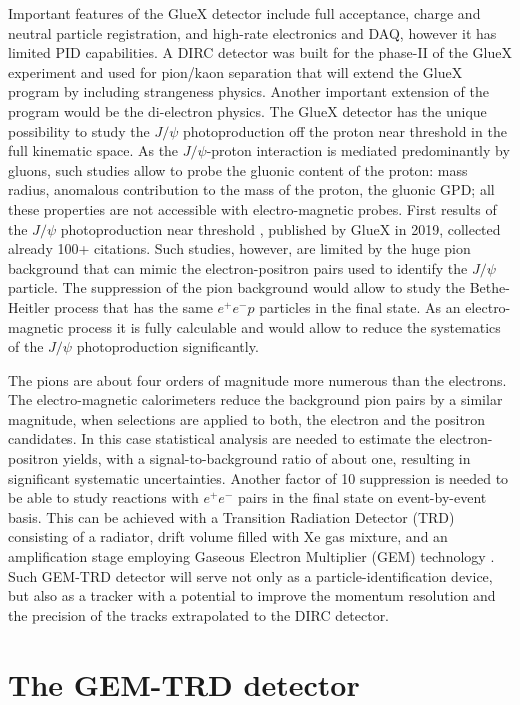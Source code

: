 \documentclass[%
preprint,
nofootinbib,
 amsmath,amssymb,
 aps,
floatfix,
]{revtex4-1}
\begin{document}
Important features of the GlueX detector include full acceptance,
charge and neutral particle registration, and high-rate
electronics and DAQ, however it has limited PID capabilities.
A DIRC detector was built for the phase-II of the GlueX experiment 
and used for pion/kaon separation that will extend the GlueX program
by including strangeness physics.
Another important extension of the program 
would be the di-electron physics.
The GlueX detector has the unique possibility to study the $J/\psi $
photoproduction off the proton near threshold in the full kinematic space. 
As the $J/\psi $-proton interaction is mediated predominantly by gluons,
such studies allow to probe the gluonic content of the proton:
mass radius, anomalous contribution to the mass of the proton, 
the gluonic GPD; all these properties are not accessible with
electro-magnetic probes.
First results of the $J/\psi $ photoproduction near threshold \cite{prl_gluex},
published by GlueX in 2019, collected already 100+ citations. 
Such studies, however, are limited by the huge pion background
that can mimic the electron-positron pairs used to identify 
the $J/\psi $ particle. 
The suppression of the pion background would allow to study
the Bethe-Heitler process that has the same $e^+e^-p$ particles
in the final state.
As an electro-magnetic process it is fully calculable and would
allow to reduce the systematics of the $J/\psi $ photoproduction
significantly.

The pions are about four orders of magnitude more numerous 
than the electrons.
The electro-magnetic calorimeters reduce the background pion
pairs by a similar magnitude, when selections are applied to both, 
the electron and the positron candidates. 
In this case statistical analysis are needed to estimate 
the electron-positron yields, with a signal-to-background ratio of about one,
resulting in significant systematic uncertainties.
Another factor of 10 suppression is needed to be able to study
reactions with $e^+e^-$ pairs in the final state on event-by-event basis.
This can be achieved with a Transition Radiation Detector (TRD)
consisting of a radiator, drift volume filled with Xe gas mixture,
and an amplification stage employing Gaseous Electron Multiplier 
(GEM) technology \cite{NIM_GEM_TRD}. 
Such GEM-TRD detector will serve not only as a particle-identification 
device, but also as a tracker with a potential to improve 
the momentum resolution and the precision of the tracks extrapolated to
the DIRC detector.

\section{The GEM-TRD detector}
\end{document}
